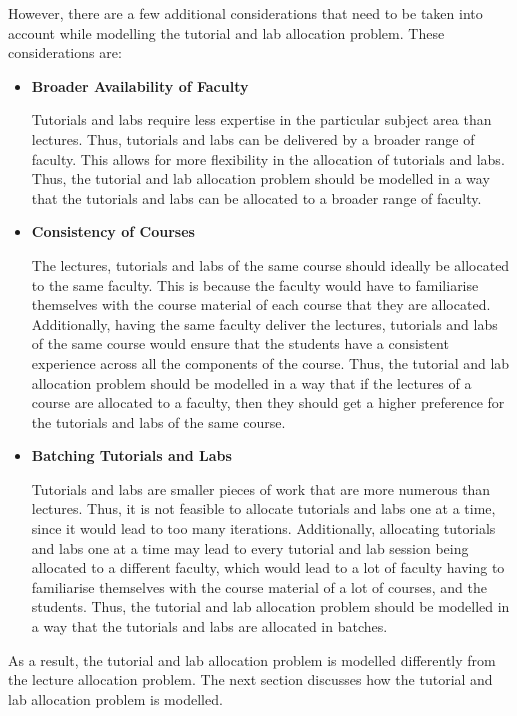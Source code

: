 However, there are a few additional considerations that need to be taken into account while modelling the tutorial and lab allocation problem. These considerations are:

\begin{itemize}
  \item \textbf{Broader Availability of Faculty}

        Tutorials and labs require less expertise in the particular subject area than lectures. Thus, tutorials and labs can be delivered by a broader range of faculty. This allows for more flexibility in the allocation of tutorials and labs. Thus, the tutorial and lab allocation problem should be modelled in a way that the tutorials and labs can be allocated to a broader range of faculty.

  \item \textbf{Consistency of Courses}

        The lectures, tutorials and labs of the same course should ideally be allocated to the same faculty. This is because the faculty would have to familiarise themselves with the course material of each course that they are allocated. Additionally, having the same faculty deliver the lectures, tutorials and labs of the same course would ensure that the students have a consistent experience across all the components of the course. Thus, the tutorial and lab allocation problem should be modelled in a way that if the lectures of a course are allocated to a faculty, then they should get a higher preference for the tutorials and labs of the same course.

  \item \textbf{Batching Tutorials and Labs}

        Tutorials and labs are smaller pieces of work that are more numerous than lectures. Thus, it is not feasible to allocate tutorials and labs one at a time, since it would lead to too many iterations. Additionally, allocating tutorials and labs one at a time may lead to every tutorial and lab session being allocated to a different faculty, which would lead to a lot of faculty having to familiarise themselves with the course material of a lot of courses, and the students. Thus, the tutorial and lab allocation problem should be modelled in a way that the tutorials and labs are allocated in batches.

\end{itemize}

As a result, the tutorial and lab allocation problem is modelled differently from the lecture allocation problem. The next section discusses how the tutorial and lab allocation problem is modelled.

